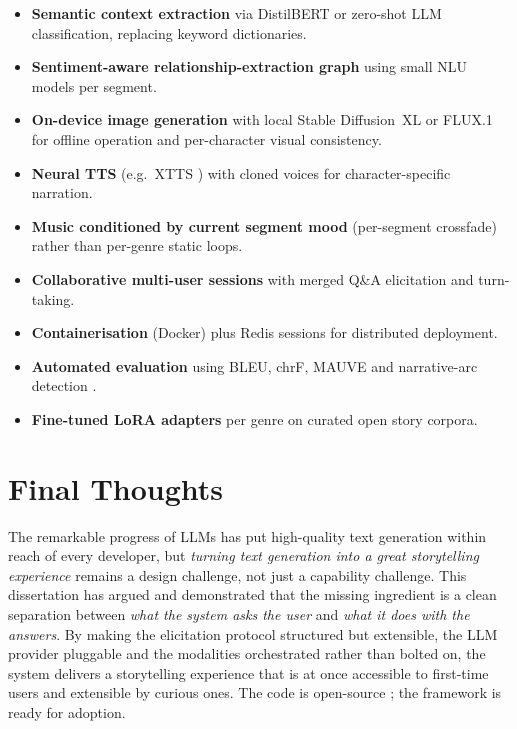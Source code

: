 \begin{itemize}
    \item \textbf{Semantic context extraction} via DistilBERT or
    zero-shot LLM classification, replacing keyword dictionaries.
    \item \textbf{Sentiment-aware relationship-extraction graph}
    using small NLU models per segment.
    \item \textbf{On-device image generation} with local Stable
    Diffusion~XL or FLUX.1 for offline operation and per-character
    visual consistency.
    \item \textbf{Neural TTS} (e.g.\ XTTS \cite{casanova2024xtts})
    with cloned voices for character-specific narration.
    \item \textbf{Music conditioned by current segment mood}
    (per-segment crossfade) rather than per-genre static loops.
    \item \textbf{Collaborative multi-user sessions} with merged
    Q\&A elicitation and turn-taking.
    \item \textbf{Containerisation} (Docker) plus Redis sessions
    for distributed deployment.
    \item \textbf{Automated evaluation} using BLEU, chrF, MAUVE and
    narrative-arc detection \cite{lin2024evalnarrate}.
    \item \textbf{Fine-tuned LoRA adapters} per genre on curated
    open story corpora.
\end{itemize}

\section{Final Thoughts}
The remarkable progress of LLMs has put high-quality text generation
within reach of every developer, but \emph{turning text generation
into a great storytelling experience} remains a design challenge,
not just a capability challenge. This dissertation has argued and
demonstrated that the missing ingredient is a clean separation
between \emph{what the system asks the user} and \emph{what it does
with the answers}. By making the elicitation protocol structured but
extensible, the LLM provider pluggable and the modalities
orchestrated rather than bolted on, the system delivers a
storytelling experience that is at once accessible to first-time
users and extensible by curious ones. The code is open-source
\cite{jha2026repo}; the framework is ready for adoption.
